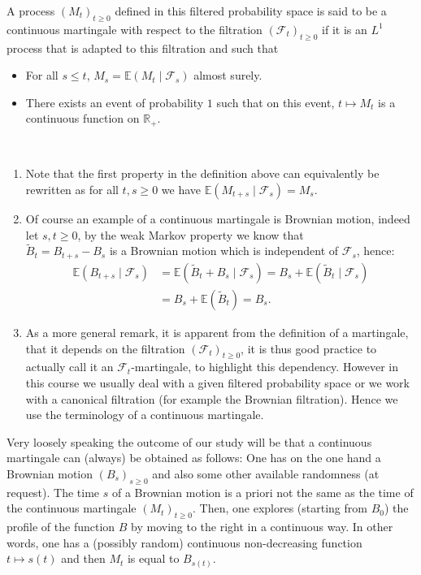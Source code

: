 \documentclass[../mainfile.tex]{subfiles}
\begin{document}
\newpage
\begin{defn} A process $(M_t)_{t \geq 0}$ defined in this filtered probability space is said to be a continuous martingale with respect to the filtration $( \mathcal{F}_t)_{t \geq 0}$ if it is an $L^1$ process that is adapted to this filtration and such that
\begin{itemize}
\item For all $s \leq t$, $M_s= \mathbb{E}(M_t \mid \mathcal{F}_s)$ almost surely.
\item There exists an event of probability $1$ such that on this event, $t \mapsto M_t$ is a continuous function on $\mathbb{R}_+$. 
\end{itemize}
\end{defn}
\begin{rem} \ \begin{enumerate}
\item Note that the first property in the definition above can equivalently be rewritten as for all $t,s \geq 0$ we have $\mathbb{E}(M_{t+s} \mid \mathcal{F}_s)= M_s.$
\item Of course an example of a continuous martingale is Brownian motion, indeed let $s,t \geq 0$, by the weak Markov property we know that\\  $\tilde{B}_t= B_{t+s}-B_s$ is a Brownian motion which is independent of $\mathcal{F}_s$, hence:
\begin{align*}
\mathbb{E}(B_{t+s} \mid \mathcal{F}_s)&=  \mathbb{E}( \tilde{B}_t + B_s \mid \mathcal{F}_s)=B_s + \mathbb{E}(\tilde{B}_t \mid \mathcal{F}_s) \\
& = B_s+\mathbb{E}( \tilde{B}_t ) = B_s.
\end{align*} 
\item As a more general remark, it is apparent from the definition of a martingale, that it depends on the filtration $( \mathcal{F}_t)_{t \geq 0}$, it is thus good practice to actually call it an $\mathcal{F}_t$-martingale, to highlight this dependency. However in this course we usually deal with a given filtered probability space or we work with a canonical filtration (for example the Brownian filtration). Hence we use the terminology of a continuous martingale.
\end{enumerate}
\end{rem}
Very loosely speaking the outcome of our study will be that a continuous martingale can (always) be obtained as follows: One has on the one hand a Brownian motion $(B_s)_{s \geq 0}$ and also some other available randomness (at request). The time $s$ of a Brownian motion is a priori not the same as the time of the continuous martingale $(M_t)_{t \geq 0}$. Then, one explores (starting from $B_0$) the profile of the function $B$ by moving to the right in a continuous way. In other words, one has a (possibly random) continuous non-decreasing function $t \mapsto s(t)$ and then $M_t$ is equal to $B_{s(t)}$.\\
\end{document}
